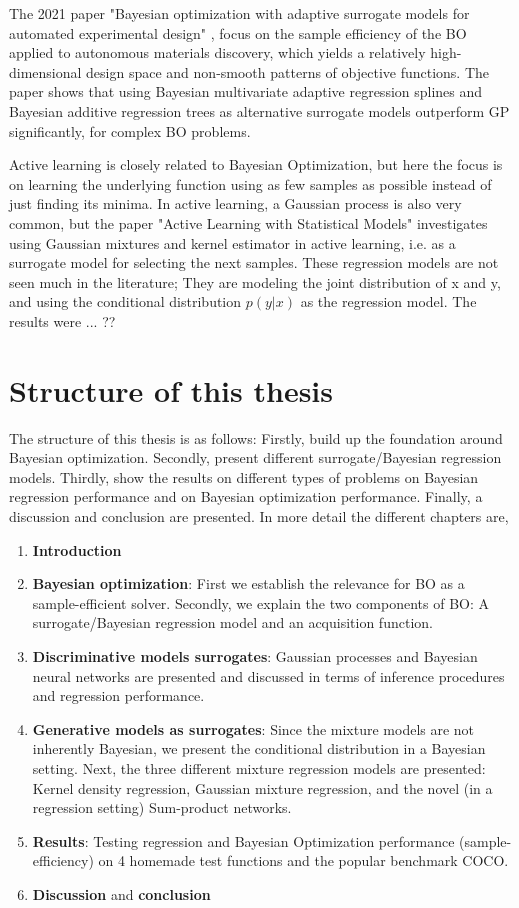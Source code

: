 The 2021 paper "Bayesian optimization with adaptive surrogate models for automated experimental design"
\cite{Nature_BO_paper}, focus on the sample efficiency of the BO applied to autonomous materials discovery, 
which yields a relatively high-dimensional design space and non-smooth patterns of objective functions.  
The paper shows that using Bayesian multivariate adaptive regression splines
and Bayesian additive regression trees as alternative surrogate models outperform GP significantly, 
for complex BO problems. 

Active learning is closely related to Bayesian Optimization, but here the focus is on learning the
underlying function using as few samples as possible instead of just finding its minima. In active
learning, a Gaussian process is also very common, but the paper "Active Learning with Statistical
Models" \cite{ALStatisticalModels} investigates using Gaussian mixtures and kernel estimator in
active learning, i.e. as a surrogate model for selecting the next samples. These regression
models are not seen much in the literature; They are modeling the joint distribution of x and y, and
using the conditional distribution $p(y|x)$ as the regression model. The results were ... ??

\section{Structure of this thesis}
The structure of this thesis is as follows: Firstly, build up the foundation around Bayesian
optimization. Secondly, present different surrogate/Bayesian regression models. Thirdly, show the
results on different types of problems on Bayesian regression performance and on Bayesian
optimization performance. Finally, a discussion and conclusion are presented. In more detail the different
chapters are, 

\begin{enumerate}[noitemsep]
    \item \textbf{Introduction}
    \item \textbf{Bayesian optimization}: First we establish the relevance for BO as a
    sample-efficient solver. Secondly, we explain the two components of BO: A 
    surrogate/Bayesian regression model and an acquisition function.
    \item \textbf{Discriminative models surrogates}: Gaussian processes and Bayesian neural
    networks are presented and discussed in terms of inference procedures and regression performance. 
    \item \textbf{Generative models as surrogates}: Since the mixture models are not 
    inherently Bayesian, we present the conditional distribution in a Bayesian setting. 
    Next, the three different mixture regression models are presented: Kernel density regression, Gaussian mixture regression,
    and the novel (in a regression setting) Sum-product networks.
    \item \textbf{Results}: Testing regression and Bayesian Optimization performance
    (sample-efficiency) on 4 homemade test functions and the popular benchmark COCO.
    \item \textbf{Discussion} and \textbf{conclusion}
\end{enumerate}

